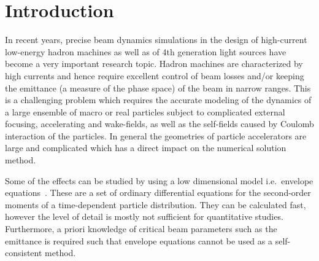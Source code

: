 \section{Introduction}
\label{sec:intro}

In recent years, precise beam dynamics simulations in the design of
high-current low-energy hadron machines as well as of 4th generation
light sources have become a very important research topic.  Hadron
machines are characterized by high currents and hence require excellent
control of beam losses and/or keeping the emittance (a measure of the
phase space) of the beam in narrow ranges.  This is a challenging
problem which requires the accurate modeling of the dynamics of a large
ensemble of macro or real particles subject to complicated external
focusing, accelerating and wake-fields, as well as the self-fields
caused by Coulomb interaction of the particles.  In general the
geometries of particle accelerators are large and complicated which has
a direct impact on the numerical solution method.

Some of the effects can be studied by using a low dimensional model
i.e.\ envelope equations~\cite{sach:68, sach:71, stru-reis:1984,
  gluckstern1}.  These are a set of ordinary differential equations for
the second-order moments of a time-dependent particle distribution.
They can be calculated fast, however the level of detail is mostly not
sufficient for quantitative studies.  Furthermore, a priori knowledge of
critical beam parameters such as the emittance is required such that
envelope equations cannot be used as a self-consistent method.


